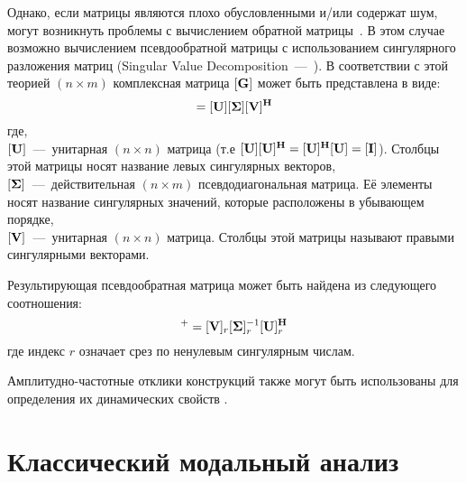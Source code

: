 Однако, если матрицы являются плохо обусловленными и/или содержат шум, могут возникнуть проблемы с вычислением обратной матрицы~\cite{lib:coupling:Gialamas}. В этом случае возможно вычислением псевдообратной матрицы с использованием сингулярного разложения матриц (Singular Value Decomposition~---~). В соответствии с этой теорией $ (n \times m) $ комплексная матрица $ [\mathbf{G}] $ может быть представлена в виде:
\begin{equation}
	[\mat{G}] = [\mat{U}][\mat{\Sigma}][\mat{V}] ^ \mat{H}
\end{equation}
где, \\
$ [\mathbf{U}] $~---~унитарная $(n \times n)$ матрица (т.е $ [\mathbf{U}][\mathbf{U}] ^ {\mathbf{H}} = [\mathbf{U}] ^ {\mathbf{H}}[\mathbf{U}] = [\mathbf{I}] $). Столбцы этой матрицы носят название левых сингулярных векторов, \\
$[\mathbf{\Sigma}]$~---~действительная $(n \times m)$ псевдодиагональная матрица. Её элементы носят название сингулярных значений, которые расположены в убывающем порядке,\\
$[\mathbf{V}]$~---~унитарная ${(n \times n)}$ матрица. Столбцы этой матрицы называют правыми сингулярными векторами. 

Результирующая псевдообратная матрица может быть найдена из следующего соотношения:
\begin{equation}
	[\mat{G}]^{+} = [\mat{V}]_r [\mat{\Sigma}]_r ^ {-1} [\mat{U}]_r ^ \mat{H}
\end{equation}
где индекс $ r $ означает срез по ненулевым сингулярным числам.

Амплитудно-частотные отклики конструкций также могут быть использованы для определения их динамических свойств \cite{lib:coupling:Xi, lib:coupling:Malekjafarian}.

\section{Классический модальный анализ}

